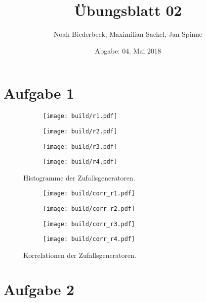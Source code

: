 \documentclass{scrartcl}
\title{Übungsblatt 02}
\author{%
  Noah Biederbeck, Maximilian Sackel, Jan Spinne
}
\date{Abgabe: 04. Mai 2018}
\begin{document}
\maketitle

\section*{Aufgabe 1}

\begin{figure}[h]
  \centering
  \begin{subfigure}{0.48\textwidth}
    \centering
    \texttt{[image: build/r1.pdf]}
    \caption{}%
    \label{fig:hist_1}
  \end{subfigure}
  \begin{subfigure}{0.48\textwidth}
    \centering
    \texttt{[image: build/r2.pdf]}
    \caption{}%
    \label{fig:hist_2}
  \end{subfigure}
  \begin{subfigure}{0.48\textwidth}
    \centering
    \texttt{[image: build/r3.pdf]}
    \caption{}%
    \label{fig:hist_3}
  \end{subfigure}
  \begin{subfigure}{0.48\textwidth}
    \centering
    \texttt{[image: build/r4.pdf]}
    \caption{}%
    \label{fig:hist_4}
  \end{subfigure}
  \caption{Histogramme der Zufallsgeneratoren.}%
  \label{fig:hist}
\end{figure}

\begin{figure}[h]
  \centering
  \begin{subfigure}{0.48\textwidth}
    \centering
    \texttt{[image: build/corr\_r1.pdf]}
    \caption{}%
    \label{fig:corr_1}
  \end{subfigure}
  \begin{subfigure}{0.48\textwidth}
    \centering
    \texttt{[image: build/corr\_r2.pdf]}
    \caption{}%
    \label{fig:corr_2}
  \end{subfigure}
  \begin{subfigure}{0.48\textwidth}
    \centering
    \texttt{[image: build/corr\_r3.pdf]}
    \caption{}%
    \label{fig:corr_3}
  \end{subfigure}
  \begin{subfigure}{0.48\textwidth}
    \centering
    \texttt{[image: build/corr\_r4.pdf]}
    \caption{}%
    \label{fig:corr_4}
  \end{subfigure}
  \caption{Korrelationen der Zufallsgeneratoren.}%
  \label{fig:corr}
\end{figure}

\section*{Aufgabe 2}
\end{document}
